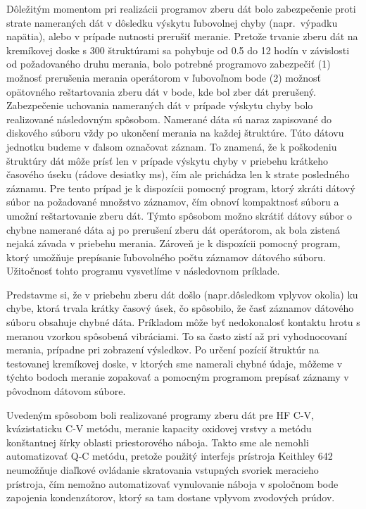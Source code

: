Dôležitým momentom pri realizácii programov zberu dát bolo
zabezpečenie proti strate nameraných dát v dôsledku výskytu ľubovolnej
chyby (napr.\ výpadku napätia), alebo v prípade nutnosti prerušiť
meranie. Pretože trvanie zberu dát na kremíkovej doske s 300
štruktúrami sa pohybuje od 0.5 do 12 hodín v závislosti od
požadovaného druhu merania, bolo potrebné programovo zabezpečiť (1)
možnosť prerušenia merania operátorom v ľubovoľnom bode (2) možnosť
opätovného reštartovania zberu dát v bode, kde bol zber dát
prerušený. Zabezpečenie uchovania nameraných dát v prípade výskytu
chyby bolo realizované následovným spôsobom. Namerané dáta sú naraz
zapisované do diskového súboru vždy po ukončení merania na každej
štruktúre. Túto dátovu jednotku budeme v ďalsom označovat záznam. To
znamená, že k poškodeniu štruktúry dát môže prísť len v prípade
výskytu chyby v priebehu krátkeho časového úseku (rádove desiatky ms),
čím ale prichádza len k strate posledného záznamu. Pre tento prípad je
k dispozícii pomocný program, ktorý zkráti dátový súbor na požadované
množstvo záznamov, čím obnoví kompaktnosť súboru a umožní
reštartovanie zberu dát. Týmto spôsobom možno skrátiť dátovy súbor o
chybne namerané dáta aj po prerušení zberu dát operátorom, ak bola
zistená nejaká závada v priebehu merania. Zároveň je k dispozícii
pomocný program, ktorý umožňuje prepísanie ľubovolného počtu záznamov
dátového súboru. Užitočnosť tohto programu vysvetlíme v následovnom
príklade.

Predstavme si, že v priebehu zberu dát došlo (napr.dôsledkom vplyvov
okolia) ku chybe, ktorá trvala krátky časový úsek, čo spôsobilo, že
časť záznamov dátového súboru obsahuje chybné dáta. Príkladom môže byť
nedokonalosť kontaktu hrotu s meranou vzorkou spôsobená vibráciami. To
sa často zistí až pri vyhodnocovaní merania, prípadne pri zobrazení
výsledkov. Po určení pozícií štruktúr na testovanej kremíkovej doske,
v ktorých sme namerali chybné údaje, môžeme v týchto bodoch meranie
zopakovať a pomocným programom prepísať záznamy v pôvodnom dátovom
súbore.

Uvedeným spôsobom boli realizované programy zberu dát pre HF C-V,
kvázistaticku C-V metódu, meranie kapacity oxidovej vrstvy a metódu
konštantnej šírky oblasti priestorového náboja. Takto sme ale nemohli
automatizovať Q-C metódu, pretože použitý interfejs prístroja Keithley
642 neumožňuje diaľkové ovládanie skratovania vstupných svoriek
meracieho prístroja, čím nemožno automatizovať vynulovanie náboja v
spoločnom bode zapojenia kondenzátorov, ktorý sa tam dostane vplyvom
zvodových prúdov.

